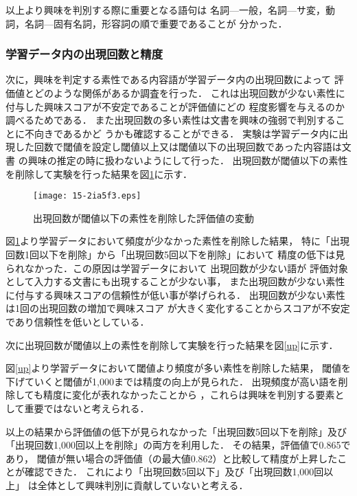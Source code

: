 \documentclass[japanese]{jnlp_1.4}
\def\tableref#1{}
\begin{document}
以上より興味を判別する際に重要となる語句は
名詞—一般，名詞—サ変，動詞，名詞—固有名詞，形容詞の順で重要であることが
分かった．



\subsubsection{学習データ内の出現回数と精度}\label{th}

次に，興味を判定する素性である内容語が学習データ内の出現回数によって
評価値とどのような関係があるか調査を行った．
これは出現回数が少ない素性に付与した興味スコアが不安定であることが評価値にどの
程度影響を与えるのか調べるためである．
また出現回数の多い素性は文書を興味の強弱で判別することに不向きであるかど
うかも確認することができる．
実験は学習データ内に出現した回数で閾値を設定し閾値以上又は閾値以下の出現回数であった内容語は文書
の興味の推定の時に扱わないようにして行った．
出現回数が閾値以下の素性を削除して実験を行った結果を図\ref{down}に示す．

\begin{figure}[b]
\begin{center}
\texttt{[image: 15-2ia5f3.eps]}
\end{center}
\caption{出現回数が閾値以下の素性を削除した評価値の変動}
\label{down}
\end{figure}

図\ref{down}より学習データにおいて頻度が少なかった素性を削除した結果，
特に「出現回数1回以下を削除」から「出現回数5回以下を削除」において
精度の低下は見られなかった．この原因は学習データにおいて
出現回数が少ない語が
評価対象として入力する文書にも出現することが少ない事，
また出現回数が少ない素性に付与する興味スコアの信頼性が低い事が挙げられる．
出現回数が少ない素性は1回の出現回数の増加で興味スコア
が大きく変化することからスコアが不安定であり信頼性を低いとしている．

次に出現回数が閾値以上の素性を削除して実験を行った結果を図\ref{up}に示す．

図\ref{up}より学習データにおいて閾値より頻度が多い素性を削除した結果，
閾値を下げていくと閾値が1,000までは精度の向上が見られた．
出現頻度が高い語を削除しても精度に変化が表れなかったことから
，これらは興味を判別する要素として重要ではないと考えられる．

以上の結果から評価値の低下が見られなかった「出現回数5回以下を削除」及び
「出現回数1,000回以上を削除」の両方を利用した．
その結果，評価値で0.865であり，
閾値が無い場合の評価値（\tableref{var_pos}の最大値0.862）と比較して精度が上昇したことが確認できた．
これにより「出現回数5回以下」及び「出現回数1,000回以上」
は全体として興味判別に貢献していないと考える．
\end{document}
